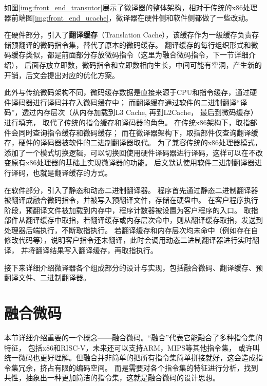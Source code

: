 如图\ref{img:front_end_transutor}展示了微译器的整体架构，相对于传统的x86处理器前端图\ref{img:front_end_ucache}，微译器在硬件侧和软件侧都做了一些改动。


在硬件部分，引入了\textbf{翻译缓存}（Translation Cache），该缓存作为一级缓存负责存储预翻译的微码指令集，替代了原本的微码缓存。
翻译缓存的每行组织形式和微码缓存类似，都是前面部分存放微码指令（这里为融合微码指令，下一节详细介绍），
后面存放立即数，微码指令和立即数相向生长，中间可能有空洞，产生新的开销，后文会提出对应的优化方案。

此外与传统微码架构不同，微码缓存数据是直接来源于CPU和指令缓存，通过硬件译码器进行译码并存入微码缓存中；
而翻译缓存通过软件的二进制翻译“译码”，透过内存层次（从内存加载到L3 Cache, 再到L2Cache， 最后到微码缓存）进行填充，
取代了传统的指令缓存和译码器的角色。
在传统x86架构下，取指部件会同时查询指令缓存和微码缓存；
而在微译器架构下，取指部件仅查询翻译缓存，硬件的译码器被软件的二进制翻译器取代。
为了兼容传统的x86处理器模式，添加了一个模式切换逻辑，可以切换回使用硬件译码器进行译码，这样可以在不改变原有x86处理器的基础上实现微译器的功能。
后文默认使用软件二进制翻译器进行译码，也就是翻译缓存的方式。


在软件部分，引入了静态和动态二进制翻译器。
程序首先通过静态二进制翻译器被翻译成融合微码指令，并被写入预翻译文件，存储在硬盘中。
在客户程序执行阶段，预翻译文件被加载到内存中，程序计数器被设置为客户程序的入口。
取指部件从翻译缓存中取指，若翻译缓存或内存层次命中，则从翻译缓存取指，发送到处理器后端执行，不断取指执行。
若翻译缓存和内存层次均未命中（例如存在自修改代码等），说明客户指令还未翻译，此时会调用动态二进制翻译器进行实时翻译，
并将翻译结果写入翻译缓存，再取指执行。

接下来详细介绍微译器各个组成部分的设计与实现，包括融合微码、翻译缓存、预翻译文件、二进制翻译器。

\section{融合微码}\label{sec:tisa}
本节详细介绍重要的一个概念——融合微码。“融合”代表它能融合了多种指令集的特征，
包括x86和RISC-V，未来还可以支持ARM，MIPS等其他指令集，
或许叫统一微码也更好理解。但融合并非简单的把所有指令集简单拼接就好，这会造成指令集冗余，挤占有限的编码空间。
而是需要对各个指令集的特征进行分析，找到共性，抽象出一种更加简洁的指令集，这就是融合微码的设计思想。

